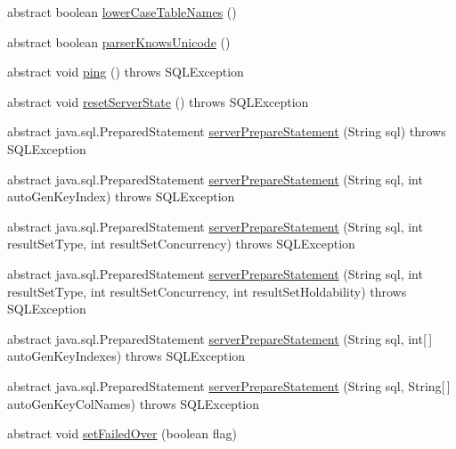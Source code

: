 \begin{DoxyCompactItemize}
abstract boolean \mbox{\hyperlink{interfacecom_1_1mysql_1_1jdbc_1_1_connection_a18c9cf0dc2d7ca1f69a3435eb4dbfde2}{lower\+Case\+Table\+Names}} ()
\item 
abstract boolean \mbox{\hyperlink{interfacecom_1_1mysql_1_1jdbc_1_1_connection_a09e06dca89e57de8d11e9e9ff2d78f4d}{parser\+Knows\+Unicode}} ()
\item 
abstract void \mbox{\hyperlink{interfacecom_1_1mysql_1_1jdbc_1_1_connection_a65a9bf75714ed318b0324f99dfa09761}{ping}} ()  throws S\+Q\+L\+Exception
\item 
abstract void \mbox{\hyperlink{interfacecom_1_1mysql_1_1jdbc_1_1_connection_ac618ee80c02d7672e277b3be75304f6e}{reset\+Server\+State}} ()  throws S\+Q\+L\+Exception
\item 
abstract java.\+sql.\+Prepared\+Statement \mbox{\hyperlink{interfacecom_1_1mysql_1_1jdbc_1_1_connection_a6e2680bb0a1c38613a4788de1916b596}{server\+Prepare\+Statement}} (String sql)  throws S\+Q\+L\+Exception
\item 
abstract java.\+sql.\+Prepared\+Statement \mbox{\hyperlink{interfacecom_1_1mysql_1_1jdbc_1_1_connection_ab063bf6d934fba06ba65eaa68aa06ef6}{server\+Prepare\+Statement}} (String sql, int auto\+Gen\+Key\+Index)  throws S\+Q\+L\+Exception
\item 
abstract java.\+sql.\+Prepared\+Statement \mbox{\hyperlink{interfacecom_1_1mysql_1_1jdbc_1_1_connection_acda6552c537e45e1d46a1d8e21beefe3}{server\+Prepare\+Statement}} (String sql, int result\+Set\+Type, int result\+Set\+Concurrency)  throws S\+Q\+L\+Exception
\item 
abstract java.\+sql.\+Prepared\+Statement \mbox{\hyperlink{interfacecom_1_1mysql_1_1jdbc_1_1_connection_aa815a139c20cb2ecb32bc50fca219c6e}{server\+Prepare\+Statement}} (String sql, int result\+Set\+Type, int result\+Set\+Concurrency, int result\+Set\+Holdability)  throws S\+Q\+L\+Exception
\item 
abstract java.\+sql.\+Prepared\+Statement \mbox{\hyperlink{interfacecom_1_1mysql_1_1jdbc_1_1_connection_ad56f84a142159320cb267e94febd72d9}{server\+Prepare\+Statement}} (String sql, int\mbox{[}$\,$\mbox{]} auto\+Gen\+Key\+Indexes)  throws S\+Q\+L\+Exception
\item 
abstract java.\+sql.\+Prepared\+Statement \mbox{\hyperlink{interfacecom_1_1mysql_1_1jdbc_1_1_connection_a7bbac014ef6bb3ad113c039f71af4bd9}{server\+Prepare\+Statement}} (String sql, String\mbox{[}$\,$\mbox{]} auto\+Gen\+Key\+Col\+Names)  throws S\+Q\+L\+Exception
\item 
abstract void \mbox{\hyperlink{interfacecom_1_1mysql_1_1jdbc_1_1_connection_af1a58f95720963635270b83f16d558b0}{set\+Failed\+Over}} (boolean flag)

\end{DoxyCompactItemize}
